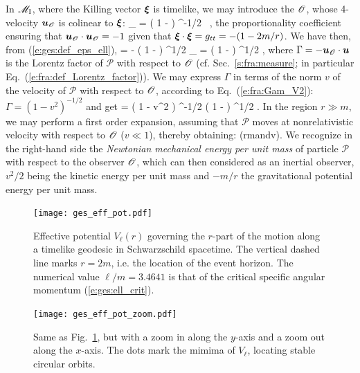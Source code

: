 In $\mathscr{M}_{\rm I}$, where the Killing vector $\bm{\xi}$ is timelike,
we may introduce the 
$\mathscr{O}$, whose 4-velocity $\bm{u}_{\mathscr{O}}$ is colinear to $\bm{\xi}$:
\be
    _{\Obs} = \left( 1 -  \right) ^{-1/2} \, \w{\xi} ,
\ee
the proportionality coefficient ensuring that $\bm{u}_{\mathscr{O}}\cdot\bm{u}_{\mathscr{O}}=-1$
given that $\bm{\xi}\cdot\bm{\xi} = g_{tt} = - (1-2m/r)$.
We have then, from (\ref{e:ges:def_eps_ell}),
\be
    \veps = - \left( 1 -  \right) ^{1/2} _{\Obs}\cdot{}
        = \Gamma \left( 1 -  \right) ^{1/2} ,
\ee
where $\Gamma = - \bm{u}_{\mathscr{O}}\cdot\bm{u}$ is the Lorentz factor of $\mathscr{P}$
with respect to $\mathscr{O}$ (cf. Sec.~\ref{s:fra:measure}; in particular Eq.~(\ref{e:fra:def_Lorentz_factor})). We may express $\Gamma$ in terms of the norm $v$ of the
velocity of $\mathscr{P}$ with respect to $\mathscr{O}$, according to Eq.~(\ref{e:fra:Gam_V2}):
$\Gamma = (1-v^2)^{-1/2}$ and get
\be
    \veps = \left( 1 - v^2 \right) ^{-1/2} \left( 1 -  \right) ^{1/2}  .
\ee
In the region $r\gg m$, we may perform a first order expansion, assuming
that  $\mathscr{P}$ moves at nonrelativistic velocity with respect to $\mathscr{O}$
($v\ll 1$), thereby obtaining:
\be \label{e:ges:veps_far}
     \qquad
    \left(r\gg m\quad\mbox{and}\quad v\right).
\ee
We recognize in the right-hand side the \emph{Newtonian mechanical energy per
unit mass} of particle $\mathscr{P}$ with respect to the observer $\mathscr{O}$, which can
then considered as an inertial observer, $v^2/2$ being the kinetic energy per unit mass
and $-m/r$ the gravitational potential energy per unit mass.

\begin{figure}
\centerline{\texttt{[image: ges\_eff\_pot.pdf]}}
\caption[]{\label{f:ges:eff_pot} \footnotesize
Effective potential $V_{\ell}(r)$ governing the $r$-part of the
motion along a timelike geodesic in
Schwarzschild spacetime. The vertical dashed line marks $r=2m$, i.e. the
location of the event horizon.
The numerical value $\ell/m=3.4641$ is that of the critical
specific angular momentum (\ref{e:ges:ell_crit}).}
\end{figure}

\begin{figure}
\centerline{\texttt{[image: ges\_eff\_pot\_zoom.pdf]}}
\caption[]{\label{f:ges:eff_pot_zoom} \footnotesize
Same as Fig.~\ref{f:ges:eff_pot}, but with a zoom in along the $y$-axis
and a zoom out along the $x$-axis. The dots mark the mimima of
$V_{\ell}$, locating stable circular orbits.}
\end{figure}

